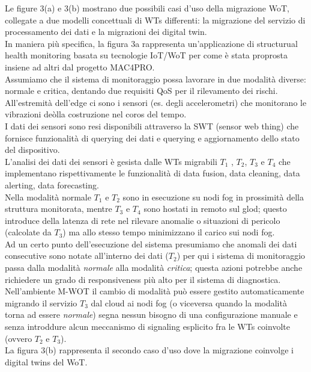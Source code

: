 \documentclass[11pt]{article}
\begin{document}
		Le figure 3(a) e 3(b) mostrano due possibili casi d'uso della migrazione WoT, collegate a due modelli concettuali di WTs differenti: la migrazione del servizio di processamento dei dati e la migrazioni dei digital twin.\\
		In maniera più specifica, la figura 3a rappresenta un'applicazione di structurual health monitoring basata su tecnologie IoT/WoT  per come è stata proprosta insiene ad altri dal progetto MAC4PRO. \\
		Assumiamo che il sistema di monitoraggio possa lavorare in due modalità diverse: normale e critica, dentando due requisiti QoS per il rilevamento dei rischi. \\
		All'estremità dell'edge ci sono i sensori (es. degli accelerometri) che monitorano le vibrazioni deòlla costruzione nel coros del tempo. \\
		I dati dei sensori sono resi disponibili attraverso la SWT (sensor web thing) che fornisce funzionalità di querying dei dati e querying e aggiornamento dello stato del dispositivo. \\
		L'analisi dei dati dei sensori è gesista dalle WTs migrabili $T_1$ , $T_2$, $T_3$ e $T_4$ che implementano rispettivamente le funzionalità di data fusion, data cleaning, data alerting, data forecasting. \\
		Nella modalità normale $T_1$ e $T_2$ sono in esecuzione su nodi fog in prossimità della struttura monitorata, mentre $T_3$ e $T_4$ sono hostati in remoto sul glod; questo introduce della latenza di rete nel rilevare anomalie o situazioni di pericolo (calcolate da $T_3$) ma allo stesso tempo minimizzano il carico sui nodi fog. \\
		Ad un certo punto dell'esecuzione del sistema presumiamo che anomali dei dati consecutive sono notate all'interno dei dati ($T_2$) per qui i sistema di monitoraggio passa dalla modalità \textit{normale} alla modalità \textit{critica}; questa azioni potrebbe anche richiedere un grado di responsiveness più alto per il sistema di diagnostica.\\
		Nell'ambiente M-WOT il cambio di modalità può essere gestito automaticamente migrando il servizio $T_3$ dal cloud ai nodi fog (o viceversa quando la modalità torna ad essere \textit{normale}) segna nessun bisogno di una configurazione manuale e senza introddure alcun meccanismo di signaling esplicito fra le WTs coinvolte (ovvero $T_2$ e $T_3$). \\
		La figura 3(b) rappresenta il secondo caso d'uso dove  la migrazione coinvolge i digital twins del WoT. \\
\end{document}
